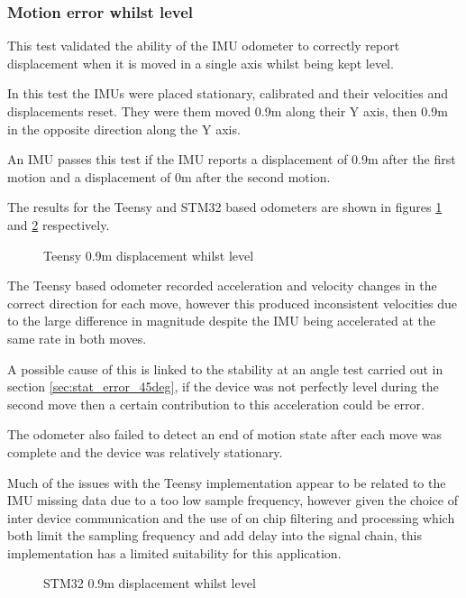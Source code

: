 \documentclass{entcs}
\begin{document}
\subsubsection{Motion error whilst level}

This test validated the ability of the IMU odometer to correctly report
displacement when it is moved in a single axis whilst being kept level.

In this test the IMUs were placed stationary, calibrated and their velocities
and displacements reset. They were them moved 0.9m along their Y axis, then 0.9m
in the opposite direction along the Y axis.

An IMU passes this test if the IMU reports a displacement of 0.9m after the
first motion and a displacement of 0m after the second motion.

The results for the Teensy and STM32 based odometers are shown in figures
\ref{fig:teensy_90cm_move} and \ref{fig:stm32_90cm_move} respectively.

\begin{figure}[h!]
  \centering
  \scalebox{0.7}{}
  \caption{Teensy 0.9m displacement whilst level}
  \label{fig:teensy_90cm_move}
\end{figure}

The Teensy based odometer recorded acceleration and velocity changes in the
correct direction for each move, however this produced inconsistent velocities
due to the large difference in magnitude despite the IMU being accelerated at
the same rate in both moves.

A possible cause of this is linked to the stability at an angle test carried out
in section \ref{sec:stat_error_45deg}, if the device was not perfectly level
during the second move then a certain contribution to this acceleration could be
error.

The odometer also failed to detect an end of motion state after each move was
complete and the device was relatively stationary.

Much of the issues with the Teensy implementation appear to be related to the
IMU missing data due to a too low sample frequency, however given the choice of
inter device communication and the use of on chip filtering and processing which
both limit the sampling frequency and add delay into the signal chain, this
implementation has a limited suitability for this application.

\begin{figure}[h!]
  \centering
  \scalebox{0.7}{}
  \caption{STM32 0.9m displacement whilst level}
  \label{fig:stm32_90cm_move}
\end{figure}
\end{document}
